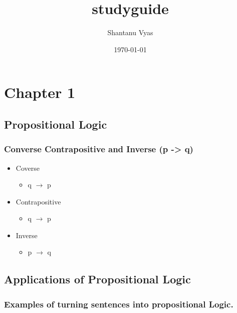 \documentclass[11pt]{article}
\title{studyguide}
\author{Shantanu Vyas}
\date{\today}
\begin{document}
\maketitle

\setcounter{tocdepth}{3}
\tableofcontents
\vspace*{1cm}
\section{Chapter 1}
\label{sec-1}
\subsection{Propositional Logic}
\label{sec-1-1}
\subsubsection{Converse Contrapositive and Inverse (p -> q)}
\label{sec-1-1-1}
\begin{itemize}

\item Coverse
\label{sec-1-1-1-1}%
\begin{itemize}

\item q $\rightarrow$  p
\label{sec-1-1-1-1-1}%
\end{itemize} %

\item Contrapositive
\label{sec-1-1-1-2}%
\begin{itemize}

\item q $\rightarrow$ \textlnot{}p
\label{sec-1-1-1-2-1}%
\end{itemize} %

\item Inverse
\label{sec-1-1-1-3}%
\begin{itemize}

\item \textlnot{}p $\rightarrow$ \textlnot{}q
\label{sec-1-1-1-3-1}%
\end{itemize} %
\end{itemize} %
\subsection{Applications of Propositional Logic}
\label{sec-1-2}
\subsubsection{Examples of turning sentences into propositional Logic.}
\label{sec-1-2-1}
\end{document}
